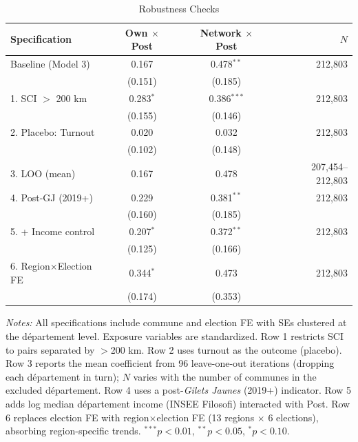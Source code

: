 \documentclass[12pt]{article}
\newcommand{\gj}{\textit{Gilets Jaunes}}
\newcommand{\dept}{d\'{e}partement}
\begin{document}
\begin{table}[H]
\centering
\caption{Robustness Checks}
\label{tab:robustness}
\begin{threeparttable}
\begin{tabular}{@{}lccccr@{}}
\toprule
Specification & Own $\times$ Post & & Network $\times$ Post & & $N$ \\
\midrule
Baseline (Model 3)  & 0.167 & & 0.478$^{**}$ & & 212,803 \\
                     & (0.151) & & (0.185) & & \\[3pt]
1. SCI $>$ 200 km   & 0.283$^{*}$ & & 0.386$^{***}$ & & 212,803 \\
                     & (0.155) & & (0.146) & & \\[3pt]
2. Placebo: Turnout  & 0.020 & & 0.032 & & 212,803 \\
                     & (0.102) & & (0.148) & & \\[3pt]
3. LOO (mean)        & 0.167 & & 0.478 & & 207,454--212,803 \\[3pt]
4. Post-GJ (2019+)  & 0.229 & & 0.381$^{**}$ & & 212,803 \\
                     & (0.160) & & (0.185) & & \\[3pt]
5. + Income control  & 0.207$^{*}$ & & 0.372$^{**}$ & & 212,803 \\
                     & (0.125) & & (0.166) & & \\[3pt]
6. Region$\times$Election FE & 0.344$^{*}$ & & 0.473 & & 212,803 \\
                     & (0.174) & & (0.353) & & \\
\bottomrule
\end{tabular}
\begin{tablenotes}[flushleft]
\small
\item \textit{Notes:} All specifications include commune and election FE with SEs clustered at the \dept{} level. Exposure variables are standardized. Row 1 restricts SCI to pairs separated by $>$200 km. Row 2 uses turnout as the outcome (placebo). Row 3 reports the mean coefficient from 96 leave-one-out iterations (dropping each \dept{} in turn); $N$ varies with the number of communes in the excluded \dept{}. Row 4 uses a post-\gj{} (2019+) indicator. Row 5 adds log median \dept{} income (INSEE Filosofi) interacted with Post. Row 6 replaces election FE with region$\times$election FE (13 regions $\times$ 6 elections), absorbing region-specific trends.
$^{***}p<0.01$, $^{**}p<0.05$, $^{*}p<0.10$.
\end{tablenotes}
\end{threeparttable}
\end{table}
\end{document}
